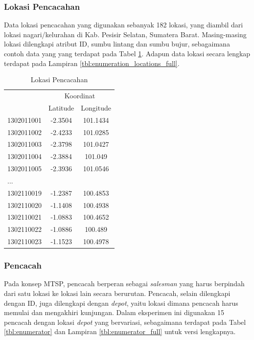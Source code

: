 \subsubsection{Lokasi Pencacahan}
Data lokasi pencacahan yang digunakan sebanyak 182 lokasi, yang diambil dari lokasi nagari/kelurahan di Kab. Pesisir Selatan, Sumatera Barat. Masing-masing lokasi dilengkapi atribut ID, sumbu lintang dan sumbu bujur, sebagaimana contoh data yang yang terdapat pada Tabel \ref{tbl:enumeration_locations}. Adapun data lokasi secara lengkap terdapat pada Lampiran \ref{tbl:enumeration_locations_full}.


\begin{table}
	\centering
	\caption{Lokasi Pencacahan}
	\label{tbl:enumeration_locations}
	\begin{tabular}{lcc}
		\toprule
			& \multicolumn{2}{c}{Koordinat}\\
		\cmidrule{2-3}
			& Latitude & Longitude\\ 
		\midrule
			1302011001 & -2.3504 & 101.1434\\ 
			1302011002 & -2.4233 & 101.0285\\ 
			1302011003 & -2.3798 & 101.0427\\ 
			1302011004 & -2.3884 & 101.049\\ 
			1302011005 & -2.3936 & 101.0546\\
			...\\
			1302110019 & -1.2387 & 100.4853\\ 
			1302110020 & -1.1408 & 100.4938\\ 
			1302110021 & -1.0883 & 100.4652\\ 
			1302110022 & -1.0886 & 100.489\\ 
			1302110023 & -1.1523 & 100.4978\\
		\bottomrule
	\end{tabular}
\end{table}


\subsubsection{Pencacah}
Pada konsep MTSP, pencacah berperan sebagai \textit{salesman} yang harus berpindah dari satu lokasi ke lokasi lain secara berurutan. Pencacah, selain dilengkapi dengan ID, juga dilengkapi dengan \textit{depot}, yaitu lokasi dimana pencacah harus memulai dan mengakhiri kunjungan. Dalam eksperimen ini digunakan 15 pencacah dengan lokasi \textit{depot} yang bervariasi, sebagaimana terdapat pada Tabel \ref{tbl:enumerator} dan Lampiran \ref{tbl:enumerator_full} untuk versi lengkapnya.


